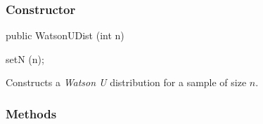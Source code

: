 \subsubsection* {Constructor}

\begin{code}

   public WatsonUDist (int n)\begin{hide} {
      setN (n);
   }\end{hide}
\end{code}
\begin{tabb}
   Constructs a {\em Watson U\/} distribution for a sample of size $n$.

\end{tabb}

\subsubsection* {Methods}

